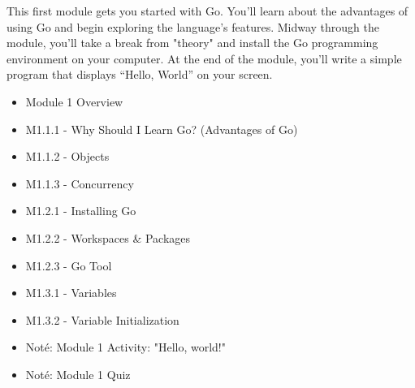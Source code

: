 This first module gets you started with Go. You'll learn about the advantages of using Go and begin exploring the language's features. Midway through the module, you’ll take a break from "theory" and install the Go programming environment on your computer. At the end of the module, you'll write a simple program that displays “Hello, World” on your screen.

\begin{itemize}[label={$\bullet$}]
   \item  Module 1 Overview
   \item  M1.1.1 - Why Should I Learn Go? (Advantages of Go)
   \item  M1.1.2 - Objects
   \item  M1.1.3 - Concurrency
   \item  M1.2.1 - Installing Go
   \item  M1.2.2 - Workspaces \& Packages
   \item  M1.2.3 - Go Tool
   \item  M1.3.1 - Variables
   \item  M1.3.2 - Variable Initialization
   \item Noté: Module 1 Activity: "Hello, world!"
   \item Noté: Module 1 Quiz
\end{itemize}


